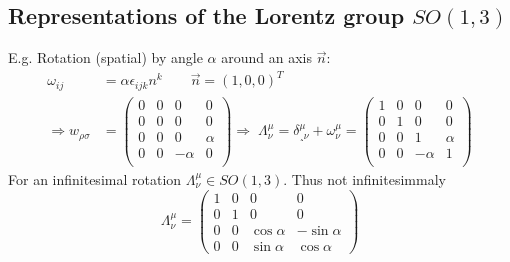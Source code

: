 
\subsection{Representations of the Lorentz group $SO(1,3)$}







E.g. Rotation (spatial) by angle $\alpha$ around an axis $\vec{n}$:
\begin{align*}
	\omega_{ij} &= \alpha \epsilon_{ijk} n^k \qquad \vec{n} = (1,0,0)^T\\
	\Rightarrow 	w_{\rho \sigma} &=
	\begin{pmatrix}
		0&0&0&0\\
		0&0&0&0 \\
		0&0&0&\alpha \\
		0&0&-\alpha &0\\
	\end{pmatrix}
	\Rightarrow \; \Lambda^{\mu}_{\nu} = \delta^{\mu}_{¸\nu} + \omega^{\mu}_{\nu} = 
	\begin{pmatrix}
		1 &0&0&0\\
		0&1&0&0 \\
		0&0&1&\alpha \\
		0&0&-\alpha &1 \\
	\end{pmatrix}
\end{align*}
For an infinitesimal rotation $\Lambda^{\mu}_{\nu} \in SO(1,3)$. Thus not infinitesimmaly
\begin{equation}
\Lambda^{\mu}_{\nu} = 
\begin{pmatrix}
1&0&0&0\\
0&1&0&0 \\
0&0& \cos \alpha & -\sin \alpha \\
0&0& \sin\alpha & \cos \alpha
\end{pmatrix}
\end{equation}


